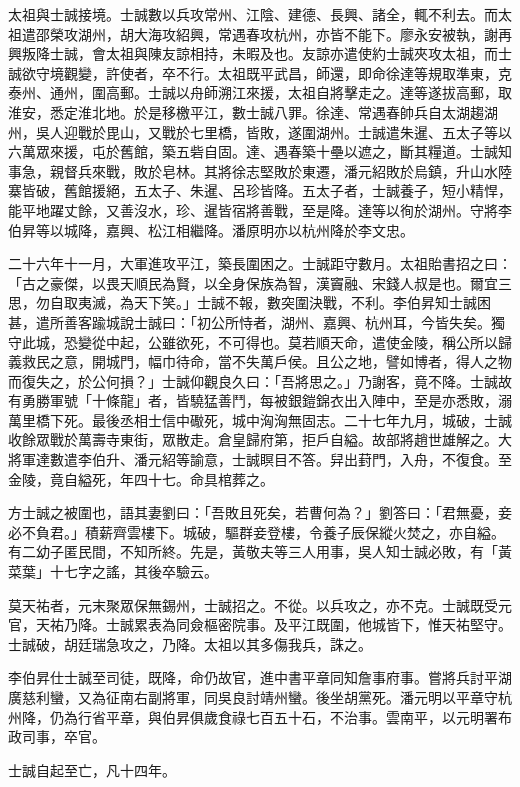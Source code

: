 太祖與士誠接境。士誠數以兵攻常州、江陰、建德、長興、諸全，輒不利去。而太祖遣邵榮攻湖州，胡大海攻紹興，常遇春攻杭州，亦皆不能下。廖永安被執，謝再興叛降士誠，會太祖與陳友諒相持，未暇及也。友諒亦遣使約士誠夾攻太祖，而士誠欲守境觀變，許使者，卒不行。太祖既平武昌，師還，即命徐達等規取準東，克泰州、通州，圍高郵。士誠以舟師溯江來援，太祖自將擊走之。達等遂拔高郵，取淮安，悉定淮北地。於是移檄平江，數士誠八罪。徐達、常遇春帥兵自太湖趨湖州，吳人迎戰於毘山，又戰於七里橋，皆敗，遂圍湖州。士誠遣朱暹、五太子等以六萬眾來援，屯於舊館，築五砦自固。達、遇春築十壘以遮之，斷其糧道。士誠知事急，親督兵來戰，敗於皂林。其將徐志堅敗於東遷，潘元紹敗於烏鎮，升山水陸寨皆破，舊館援絕，五太子、朱暹、呂珍皆降。五太子者，士誠養子，短小精悍，能平地躍丈餘，又善沒水，珍、暹皆宿將善戰，至是降。達等以徇於湖州。守將李伯昇等以城降，嘉興、松江相繼降。潘原明亦以杭州降於李文忠。

二十六年十一月，大軍進攻平江，築長圍困之。士誠距守數月。太祖貽書招之曰：「古之豪傑，以畏天順民為賢，以全身保族為智，漢竇融、宋錢人叔是也。爾宜三思，勿自取夷滅，為天下笑。」士誠不報，數突圍決戰，不利。李伯昇知士誠困甚，遣所善客踰城說士誠曰：「初公所恃者，湖州、嘉興、杭州耳，今皆失矣。獨守此城，恐變從中起，公雖欲死，不可得也。莫若順天命，遣使金陵，稱公所以歸義救民之意，開城門，幅巾待命，當不失萬戶侯。且公之地，譬如博者，得人之物而復失之，於公何損？」士誠仰觀良久曰：「吾將思之。」乃謝客，竟不降。士誠故有勇勝軍號「十條龍」者，皆驍猛善鬥，每被銀鎧錦衣出入陣中，至是亦悉敗，溺萬里橋下死。最後丞相士信中礮死，城中洶洶無固志。二十七年九月，城破，士誠收餘眾戰於萬壽寺東街，眾散走。倉皇歸府第，拒戶自縊。故部將趙世雄解之。大將軍達數遣李伯升、潘元紹等諭意，士誠瞑目不答。舁出葑門，入舟，不復食。至金陵，竟自縊死，年四十七。命具棺葬之。

方士誠之被圍也，語其妻劉曰：「吾敗且死矣，若曹何為？」劉答曰：「君無憂，妾必不負君。」積薪齊雲樓下。城破，驅群妾登樓，令養子辰保縱火焚之，亦自縊。有二幼子匿民間，不知所終。先是，黃敬夫等三人用事，吳人知士誠必敗，有「黃菜葉」十七字之謠，其後卒驗云。

莫天祐者，元末聚眾保無錫州，士誠招之。不從。以兵攻之，亦不克。士誠既受元官，天祐乃降。士誠累表為同僉樞密院事。及平江既圍，他城皆下，惟天祐堅守。士誠破，胡廷瑞急攻之，乃降。太祖以其多傷我兵，誅之。

李伯昇仕士誠至司徒，既降，命仍故官，進中書平章同知詹事府事。嘗將兵討平湖廣慈利蠻，又為征南右副將軍，同吳良討靖州蠻。後坐胡黨死。潘元明以平章守杭州降，仍為行省平章，與伯昇俱歲食祿七百五十石，不治事。雲南平，以元明署布政司事，卒官。

士誠自起至亡，凡十四年。

